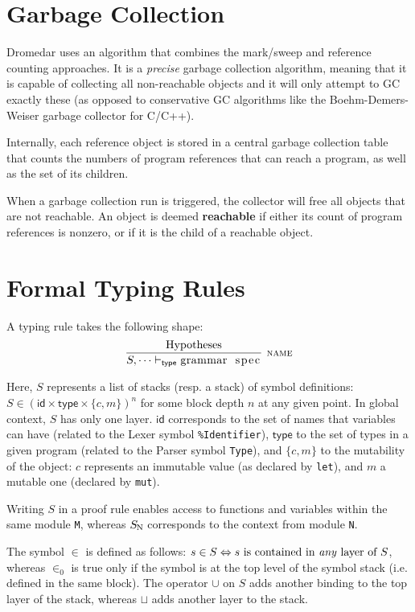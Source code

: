 \documentclass{article}
\newcommand{\code}[1]{\lstinline[columns=fixed]{#1}}
\newcommand{\drmrule}[5]{\frac{#1}{#2\vdash_{\mathsf{#3}}#4}\textsc{\ \small{#5}}}
\newcommand{\mc}[1]{\textnormal{\code{#1}}}
\begin{document}
	\section{Garbage Collection}
	
		Dromedar uses an algorithm that combines the mark/sweep and reference counting approaches. It is a \textit{precise} garbage collection algorithm, meaning that it is capable of collecting all non-reachable objects and it will only attempt to GC exactly these (as opposed to conservative GC algorithms like the Boehm-Demers-Weiser garbage collector for C/C++).
		
		Internally, each reference object is stored in a central garbage collection table that counts the numbers of program references that can reach a program, as well as the set of its children.
		
		When a garbage collection run is triggered, the collector will free all objects that are not reachable. An object is deemed \textbf{reachable} if either its count of program references is nonzero, or if it is the child of a reachable object.
		
	\section{Formal Typing Rules}
	
		A typing rule takes the following shape: $$ \drmrule{\mathrm{Hypotheses}}{S,\dots}{type}{\mc{grammar spec}}{name} $$
		
		Here, $S$ represents a list of stacks (resp. a stack) of symbol definitions: $S \in (\mathsf{id} \times \mathsf{type} \times \{c,m\})^n$ for some block depth $n$ at any given point. In global context, $S$ has only one layer. $\mathsf{id}$ corresponds to the set of names that variables can have (related to the Lexer symbol \texttt{\%Identifier}), $\mathsf{type}$ to the set of types in a given program (related to the Parser symbol \texttt{Type}), and $\{c,m\}$ to the mutability of the object: $c$ represents an immutable value (as declared by \code{let}), and $m$ a mutable one (declared by \code{mut}).
		
		Writing $S$ in a proof rule enables access to functions and variables within the same module \code{M}, whereas $S_{\mc{N}}$ corresponds to the context from module \code{N}.
		
		The symbol $\in$ is defined as follows: $s\in S \Leftrightarrow \textnormal{$s$ is contained in \textit{any} layer of $S$}$, whereas $\in_0$ is true only if the symbol is at the top level of the symbol stack (i.e. defined in the same block). The operator $\cup$ on $S$ adds another binding to the top layer of the stack, whereas $\sqcup$ adds another layer to the stack.
		
\end{document}
